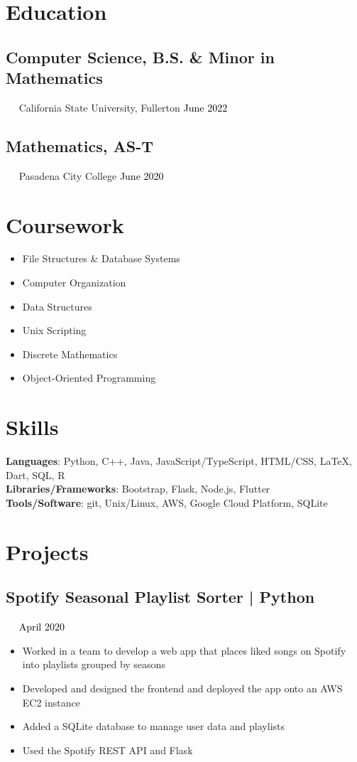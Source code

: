 \documentclass{article}
\newcommand{\resumesection}[3]{
    \subsection*{#1}
    \ 
    \ 
    \small
    \textcolor{csufgrey}{#2}
    \normalsize
    \hfill
    \textcolor{black}{#3}
    \normalsize
}
\begin{document}
\pagestyle{useheader}

\section*{Education}
\resumesection{Computer Science, B.S. \& Minor in Mathematics}{California State University, Fullerton}{June 2022}%
\resumesection{Mathematics, AS-T}{Pasadena City College}{June 2020}
\section*{Coursework}
\setlength{\multicolsep}{0pt}
\begin{multicols}{2}
    \noindent
    \begin{itemize}
        \item File Structures \& Database Systems
        \item Computer Organization
        \item Data Structures
        \item Unix Scripting
        \item Discrete Mathematics
        \item Object-Oriented Programming
    \end{itemize}
\end{multicols}
\hfill
\section*{Skills}
\textbf{Languages}: Python, C++, Java, JavaScript/TypeScript, HTML/CSS, {\selectfont\LaTeX}, Dart, SQL, R\\
\textbf{Libraries/Frameworks}: Bootstrap, Flask, Node.js, Flutter\\
\textbf{Tools/Software}: git, Unix/Linux, AWS, Google Cloud Platform, SQLite
\\
\section*{Projects}
\resumesection{Spotify Seasonal Playlist Sorter | Python}{}{April 2020}
\begin{itemize}
    \item Worked in a team to develop a web app that places liked songs on Spotify into playlists grouped by seasons
    \item Developed and designed the frontend and deployed the app onto an AWS EC2 instance
    \item Added a SQLite database to manage user data and playlists
    \item Used the Spotify REST API and Flask
\end{itemize}
\end{document}

